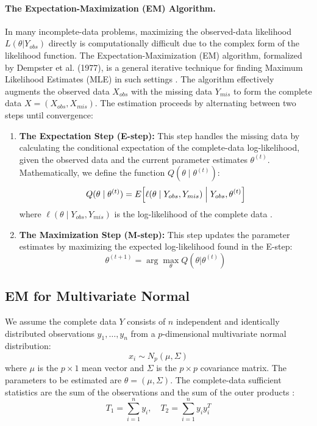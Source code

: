 \documentclass[11pt, a4paper]{article}
\begin{document}
\paragraph{The Expectation-Maximization (EM) Algorithm.}
In many incomplete-data problems, maximizing the observed-data likelihood $L(\theta | Y_{obs})$ directly is computationally difficult due to the complex form of the likelihood function.
The Expectation-Maximization (EM) algorithm, formalized by Dempster et al. (1977), is a general iterative technique for finding Maximum Likelihood Estimates (MLE) in such settings \citep{McLachlan2008}.
The algorithm effectively augments the observed data $X_{obs}$ with the missing data $Y_{mis}$ to form the complete data $X = (X_{obs}, X_{mis})$.
The estimation proceeds by alternating between two steps until convergence:

\begin{enumerate}
    \item \textbf{The Expectation Step (E-step):} This step handles the missing data by calculating the conditional expectation of the complete-data log-likelihood, given the observed data and the current parameter estimates $\theta^{(t)}$.
    Mathematically, we define the function $Q(\theta \mid \theta^{(t)})$:
    $$
    Q(\theta \mid \theta^{(t)}) = E \Big[ \ell(\theta \mid Y_{obs}, Y_{mis}) \Bigm| Y_{obs}, \theta^{(t)} \Big]
    $$
    where $\ell(\theta \mid Y_{obs}, Y_{mis})$ is the log-likelihood of the complete data \citep{McLachlan2008}.
\item \textbf{The Maximization Step (M-step):} This step updates the parameter estimates by maximizing the expected log-likelihood found in the E-step:
    $$
    \theta^{(t+1)} = \arg\max_{\theta} Q(\theta | \theta^{(t)})
    $$
\end{enumerate}

\subsection{EM for Multivariate Normal}
We assume the complete data $Y$ consists of $n$ independent and identically distributed observations $y_1, \dots, y_n$ from a $p$-dimensional multivariate normal distribution:
\begin{equation}
x_i \sim N_p(\mu, \Sigma)
\end{equation}
where $\mu$ is the $p \times 1$ mean vector and $\Sigma$ is the $p \times p$ covariance matrix.
The parameters to be estimated are $\theta = (\mu, \Sigma)$.
The complete-data sufficient statistics are the sum of the observations and the sum of the outer products \citep{LittleRubin2019}:
\begin{equation}
T_1 = \sum_{i=1}^n y_i, \quad T_2 = \sum_{i=1}^n y_i y_i^T
\end{equation}
\end{document}

